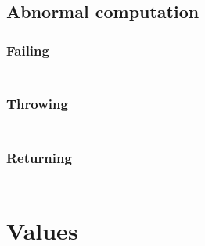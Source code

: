 \subsection{Abnormal computation}\hypertarget{abnormal-computation}{}\label{abnormal-computation}

\subsubsection{Failing}\hypertarget{failing}{}\label{failing}

\begin{align*}
  [ \
  \KEY{Funcon} \quad & \NAMEHYPER{../../../../../Funcons-beta/Computations/Abnormal}{Failing}{finalise-failing} \\
  \KEY{Funcon} \quad & \NAMEHYPER{../../../../../Funcons-beta/Computations/Abnormal}{Failing}{checked}
  \ ]
\end{align*}
\subsubsection{Throwing}\hypertarget{throwing}{}\label{throwing}

\begin{align*}
  [ \
  \KEY{Funcon} \quad & \NAMEHYPER{../../../../../Funcons-beta/Computations/Abnormal}{Throwing}{finalise-throwing} \\
  \KEY{Funcon} \quad & \NAMEHYPER{../../../../../Funcons-beta/Computations/Abnormal}{Throwing}{throw} \\
  \KEY{Funcon} \quad & \NAMEHYPER{../../../../../Funcons-beta/Computations/Abnormal}{Throwing}{handle-thrown}
  \ ]
\end{align*}
\subsubsection{Returning}\hypertarget{returning}{}\label{returning}

\begin{align*}
  [ \
  \KEY{Funcon} \quad & \NAMEHYPER{../../../../../Funcons-beta/Computations/Abnormal}{Returning}{return} \\
  \KEY{Funcon} \quad & \NAMEHYPER{../../../../../Funcons-beta/Computations/Abnormal}{Returning}{handle-return}
  \ ]
\end{align*}
\section{Values}\hypertarget{values}{}\label{values}

